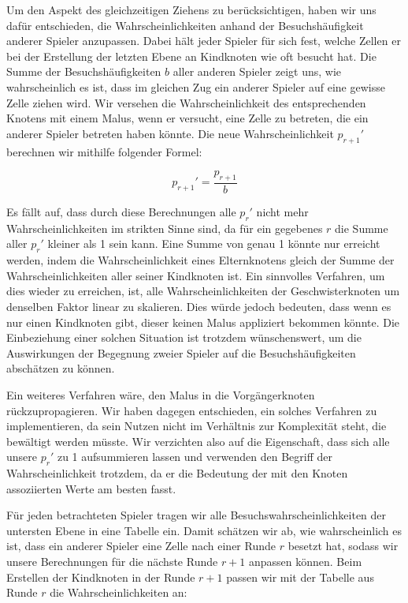 \documentclass[12pt,a4paper]{article}
\begin{document}
Um den Aspekt des gleichzeitigen Ziehens zu berücksichtigen, haben wir uns dafür entschieden, die Wahrscheinlichkeiten anhand der Besuchshäufigkeit anderer Spieler anzupassen. Dabei hält jeder Spieler für sich fest, welche Zellen er bei der Erstellung der letzten Ebene an Kindknoten wie oft besucht hat. Die Summe der Besuchshäufigkeiten $b$ aller anderen Spieler zeigt uns, wie wahrscheinlich es ist, dass im gleichen Zug ein anderer Spieler auf eine gewisse Zelle ziehen wird. Wir versehen die Wahrscheinlichkeit des entsprechenden Knotens mit einem Malus, wenn er versucht, eine Zelle zu betreten, die ein anderer Spieler betreten haben könnte. Die neue Wahrscheinlichkeit ${p_{r+1}}'$ berechnen wir mithilfe folgender Formel:

$${p_{r+1}}' = \frac{p_{r+1}}{b}$$

Es fällt auf, dass durch diese Berechnungen alle ${p_r}'$ nicht mehr Wahrscheinlichkeiten im strikten Sinne sind, da für ein gegebenes $r$ die Summe aller ${p_r}'$ kleiner als 1 sein kann. Eine Summe von genau 1 könnte nur erreicht werden, indem die Wahrscheinlichkeit eines Elternknotens gleich der Summe der Wahrscheinlichkeiten aller seiner Kindknoten ist. Ein sinnvolles Verfahren, um dies wieder zu erreichen, ist, alle Wahrscheinlichkeiten der Geschwisterknoten um denselben Faktor linear zu skalieren. Dies würde jedoch bedeuten, dass wenn es nur einen Kindknoten gibt, dieser keinen Malus appliziert bekommen könnte. Die Einbeziehung einer solchen Situation ist trotzdem wünschenswert, um die Auswirkungen der Begegnung zweier Spieler auf die Besuchshäufigkeiten abschätzen zu können. 

Ein weiteres Verfahren wäre, den Malus in die Vorgängerknoten rückzupropagieren. Wir haben dagegen entschieden, ein solches Verfahren zu implementieren, da sein Nutzen nicht im Verhältnis zur Komplexität steht, die bewältigt werden müsste. Wir verzichten also auf die Eigenschaft, dass sich alle unsere ${p_r}'$ zu 1 aufsummieren lassen und verwenden den Begriff der Wahrscheinlichkeit trotzdem, da er die Bedeutung der mit den Knoten assoziierten Werte am besten fasst.

Für jeden betrachteten Spieler tragen wir alle Besuchswahrscheinlichkeiten der untersten Ebene in eine Tabelle ein. Damit schätzen wir ab, wie wahrscheinlich es ist, dass ein anderer Spieler eine Zelle nach einer Runde $r$ besetzt hat, sodass wir unsere Berechnungen für die nächste Runde $r+1$ anpassen können. Beim Erstellen der Kindknoten in der Runde $r+1$ passen wir mit der Tabelle aus Runde $r$ die Wahrscheinlichkeiten an:
\end{document}
